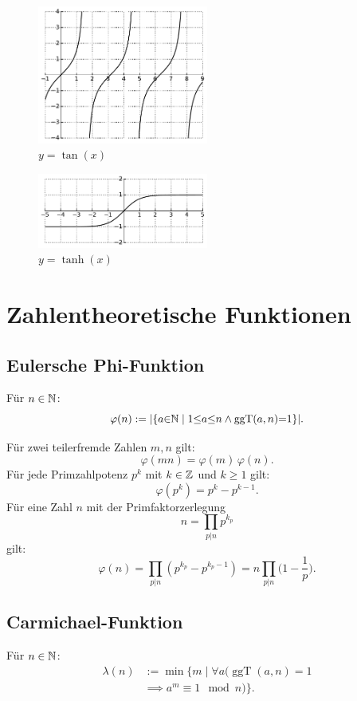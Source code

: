 \begin{figure}[h]
\includegraphics[width=0.5\textwidth]{img/tan.pdf}
\caption{$y=\tan(x)$}
\end{figure}

\begin{figure}[h]
\includegraphics[width=0.5\textwidth]{img/tanh.pdf}
\caption{$y=\tanh(x)$}
\end{figure}

\newpage
\section{Zahlentheoretische Funktionen}
\subsection{Eulersche Phi-Funktion}

\begin{definition}
Für $n\in\mathbb N$:
\begin{equation}
\varphi(n) := |\{a{\in}\mathbb N\mid 1{\le}a{\le}n\wedge\operatorname{ggT}(a,n){=}1\}|.
\end{equation}
\end{definition}

\noindent
Für zwei teilerfremde Zahlen $m,n$ gilt:
\begin{equation}
\varphi(mn) = \varphi(m)\,\varphi(n).
\end{equation}
Für jede Primzahlpotenz $p^k$ mit $k\in\mathbb Z$ und $k\ge 1$ gilt:
\begin{equation}
\varphi(p^k) = p^k-p^{k-1}.
\end{equation}
Für eine Zahl $n$ mit der Primfaktorzerlegung
\begin{equation}
n=\prod_{p|n} p^{k_p}
\end{equation}
gilt:
\begin{equation}
\varphi(n) = \prod_{p|n} (p^{k_p}-p^{k_p-1})
= n\prod_{p|n} \Big(1-\frac{1}{p}\Big).
\end{equation}

\subsection{Carmichael-Funktion}
\begin{definition}
Für $n\in\mathbb N$:
\begin{equation}
\begin{split}
\lambda(n) &:= \min\{m\mid \forall a(\operatorname{ggT}(a,n)=1\\
&\implies a^m\equiv 1\mod n)\}.
\end{split}
\end{equation}
\end{definition}
